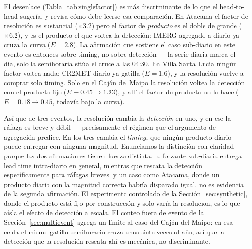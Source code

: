 \documentclass[authoryear,preprint,review,12pt]{elsarticle}
\begin{document}
El desenlace (Tabla~\ref{tab:singlefactor}) es más discriminante de lo que el
head-to-head sugería, y revisa cómo debe leerse esa comparación. En Atacama el
factor de resolución es sustancial ($\times3.2$) pero el factor de \emph{producto}
es el doble de grande ($\times6.2$), y es el producto el que voltea la detección:
IMERG agregado a diario ya cruza la curva ($E=2.8$). La afirmación que sostiene el
caso sub-diario en este evento es entonces sobre timing, no sobre detección --- la
serie diaria marca el día, solo la semihoraria sitúa el cruce a las 04:30. En Villa
Santa Lucía ningún factor voltea nada: CR2MET diario ya gatilla ($E=1.6$), y la
resolución vuelve a comprar solo timing. Solo en el Cajón del Maipo la resolución
voltea la detección con el producto fijo ($E=0.45\to1.23$), y allí el factor de
producto no lo hace ($E=0.18\to0.45$, todavía bajo la curva).

Así que de tres eventos, la resolución cambia la \emph{detección} en uno, y en ese
la ráfaga es breve y débil --- precisamente el régimen que el argumento de
agregación predice. En los tres cambia el \emph{timing}, que ningún producto diario
puede entregar con ninguna magnitud. Enunciamos la distinción con claridad porque
las dos afirmaciones tienen fuerza distinta: la forzante sub-diaria entrega lead
time intra-diario en general, mientras que rescata la detección específicamente
para ráfagas breves, y un caso como Atacama, donde un producto diario con la
magnitud correcta habría disparado igual, no es evidencia de la segunda afirmación.
El experimento controlado de la Sección~\ref{sec:synthetic}, donde el producto está
fijo por construcción y solo varía la resolución, es lo que aísla el efecto de
detección a escala. El conteo fuera de evento de la Sección~\ref{sec:multievent}
agrega un límite al caso del Cajón del Maipo: en esa celda el mismo gatillo
semihorario cruza unas siete veces al año, así que la detección que la resolución
rescata ahí es mecánica, no discriminante.
\end{document}
